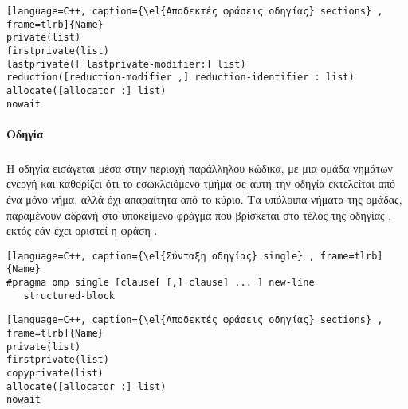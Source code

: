 \begin{spacing}{1.3}
\begin{lstlisting}[language=C++, caption={\el{Αποδεκτές φράσεις οδηγίας} sections} , frame=tlrb]{Name}
private(list) 
firstprivate(list) 
lastprivate([ lastprivate-modifier:] list) 
reduction([reduction-modifier ,] reduction-identifier : list) 
allocate([allocator :] list) 
nowait
\end{lstlisting}
\end{spacing}

\clearpage
\paragraph{Οδηγία \emph{}}
\subparagraph{}
Η οδηγία \textbf{} εισάγεται μέσα στην περιοχή παράλληλου κώδικα, με μια ομάδα νημάτων ενεργή και καθορίζει
ότι το εσωκλειόμενο τμήμα σε αυτή την οδηγία εκτελείται από ένα μόνο νήμα, αλλά όχι απαραίτητα από το κύριο. Τα υπόλοιπα
νήματα της ομάδας, παραμένουν αδρανή στο υποκείμενο φράγμα που βρίσκεται στο τέλος της οδηγίας \emph{},
εκτός εάν έχει οριστεί η φράση \emph{}\cite{openmpse16}.

\begin{spacing}{1.1}
\begin{lstlisting}[language=C++, caption={\el{Σύνταξη οδηγίας} single} , frame=tlrb]{Name} 
#pragma omp single [clause[ [,] clause] ... ] new-line 
   structured-block
\end{lstlisting}
\end{spacing}

\begin{spacing}{1.1}
\begin{lstlisting}[language=C++, caption={\el{Αποδεκτές φράσεις οδηγίας} sections} , frame=tlrb]{Name}
private(list) 
firstprivate(list) 
copyprivate(list) 
allocate([allocator :] list) 
nowait
\end{lstlisting}
\end{spacing}


